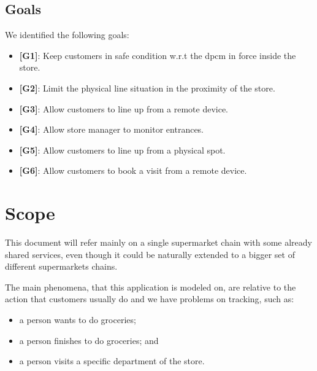 \subsection{Goals}

We identified the following goals:

\begin{itemize}

    \item {\textbf{[G1]}}: Keep customers in safe condition w.r.t the \gls{dpcm} in force inside the store.

    \item {\textbf{[G2]}}: Limit the physical line situation in the proximity of the store.

    \item {\textbf{[G3]}}: Allow customers to line up from a remote device.

    \item {\textbf{[G4]}}: Allow store manager to monitor entrances.

    \item {\textbf{[G5]}}: Allow customers to line up from a physical spot.

    \item {\textbf{[G6]}}: Allow customers to book a visit from a remote
    device.

\end{itemize}


\section{Scope}

This document will refer mainly on a single supermarket chain with some already shared services, even though it could be naturally extended to a bigger set of different supermarkets chains.

The main phenomena, that this application is modeled on, are relative to the action that customers usually do and we have problems on tracking, such as:
\begin{itemize}
    \item a person wants to do groceries;
    \item a person finishes to do groceries; and
    \item a person visits a specific department of the store.
\end{itemize}

